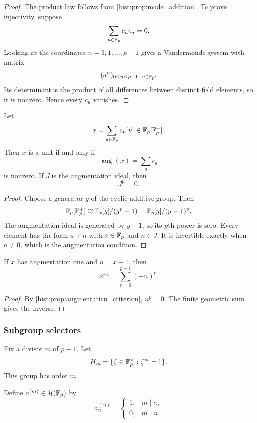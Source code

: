 \begin{proof}
The product law follows from \cref{hist:prop:mode_addition}. To prove injectivity, suppose
\[
\sum_{u\in\mathbb F_p}c_u\epsilon_u=0.
\]
Looking at the coordinates \(n=0,1,\ldots,p-1\) gives a Vandermonde system with matrix
\[
(u^n)_{0\leq n\leq p-1,\ u\in\mathbb F_p}.
\]
Its determinant is the product of all differences between distinct field elements, so it is nonzero. Hence every \(c_u\) vanishes.
\end{proof}

\begin{histproposition}\label{hist:prop:augmentation_criterion}
Let
\[
x=\sum_{u\in\mathbb F_p}c_u[u]
\in
\mathbb F_p[\mathbb F_p^+].
\]
Then \(x\) is a unit if and only if
\[
\operatorname{aug}(x)
=
\sum_uc_u
\]
is nonzero. If \(J\) is the augmentation ideal, then
\[
J^p=0.
\]
\end{histproposition}

\begin{proof}
Choose a generator \(g\) of the cyclic additive group. Then
\[
\mathbb F_p[\mathbb F_p^+]
\cong
\mathbb F_p[y]/(y^p-1)
=
\mathbb F_p[y]/(y-1)^p.
\]
The augmentation ideal is generated by \(y-1\), so its \(p\)th power is zero. Every element has the form \(a+n\) with \(a\in\mathbb F_p\) and \(n\in J\). It is invertible exactly when \(a\neq0\), which is the augmentation condition.
\end{proof}

\begin{histcorollary}\label{hist:cor:finite_inverse_formula}
If \(x\) has augmentation one and \(n=x-1\), then
\[
\boxed{
x^{-1}
=
\sum_{r=0}^{p-1}(-n)^r.
}
\]
\end{histcorollary}

\begin{proof}
By \cref{hist:prop:augmentation_criterion}, \(n^p=0\). The finite geometric sum gives the inverse.
\end{proof}

\subsubsection{Subgroup selectors}

Fix a divisor \(m\) of \(p-1\). Let
\[
H_m
=
\{\zeta\in\mathbb F_p^\times:\zeta^m=1\}.
\]
This group has order \(m\).

\begin{histdefinition}\label{hist:def:multiple_selector}
Define \(a^{(m)}\in\mathcal H(\mathbb F_p)\) by
\[
a_n^{(m)}
=
\begin{cases}
1,&m\mid n,\\
0,&m\nmid n.
\end{cases}
\]
\end{histdefinition}


